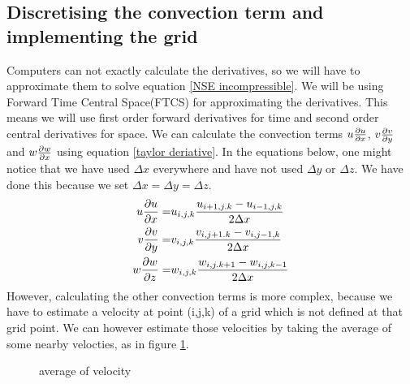 \documentclass{article}
\begin{document}
\subsection{Discretising the convection term and implementing the grid}
Computers can not exactly calculate the derivatives, so we will have to approximate them to solve equation \ref{NSE incompressible}. We will be using Forward Time Central Space(FTCS) for approximating the derivatives\cite{MAC}. This means we will use first order forward derivatives for time and second order central derivatives for space. We can calculate the convection terms \(u\pdv{u}{x}\), \(v\pdv{v}{y}\) and \(w\pdv{w}{x}\)  using equation \ref{taylor deriative}. In the equations below, one might notice that we have used \(\Delta x\) everywhere and have not used \(\Delta y\) or \(\Delta z\). We have done this because we set \(\Delta x = \Delta y = \Delta z\).
\[\begin{split}
  u\pdv{u}{x}=& u_{i,j,k}\frac{u_{i+1,j.k}-u_{i-1,j,k}}{2\Delta x}\\
  v\pdv{v}{y}=& v_{i,j,k}\frac{v_{i,j+1.k}-v_{i,j-1,k}}{2\Delta x}\\
  w\pdv{w}{z}=& w_{i,j,k}\frac{w_{i,j.k+1}-w_{i,j,k-1}}{2\Delta x}
\end{split}\]
However, calculating the other convection terms is more complex, because we have to estimate a velocity at point (i,j,k) of a grid which is not defined at that grid point. We can however estimate those velocities by taking the average of some nearby velocties, as in figure \ref{velocity to other grid}\cite{MAC}.
\begin{figure}[h]
\centering

\caption{average of velocity} \label{velocity to other grid}
\end{figure}
\end{document}
